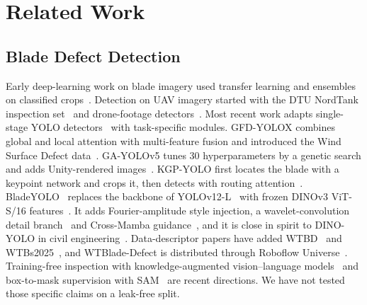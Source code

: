 \section{Related Work}
\label{sec:related}

\subsection{Blade Defect Detection}
Early deep-learning work on blade imagery used transfer learning and ensembles on classified crops~\cite{yangblade}. Detection on UAV imagery started with the DTU NordTank inspection set~\cite{shihavuddin,dtudata} and drone-footage detectors~\cite{foster}. Most recent work adapts single-stage YOLO detectors~\cite{yolo,yolov4,ultralytics,yolov12} with task-specific modules. GFD-YOLOX combines global and local attention with multi-feature fusion and introduced the Wind Surface Defect data~\cite{gfdyolox}. GA-YOLOv5 tunes 30 hyperparameters by a genetic search and adds Unity-rendered images~\cite{gayolo}. KGP-YOLO first locates the blade with a keypoint network and crops it, then detects with routing attention~\cite{kgpyolo}. BladeYOLO~\cite{bladeyolo} replaces the backbone of YOLOv12-L~\cite{yolov12} with frozen DINOv3 ViT-S/16 features~\cite{dinov3}. It adds Fourier-amplitude style injection, a wavelet-convolution detail branch~\cite{wtconv} and Cross-Mamba guidance~\cite{mamba,vmamba}, and it is close in spirit to DINO-YOLO in civil engineering~\cite{dinoyolo}. Data-descriptor papers have added WTBD~\cite{wtbd} and WTBs2025~\cite{wtbs2025}, and WTBlade-Defect is distributed through Roboflow Universe~\cite{fengche}. Training-free inspection with knowledge-augmented vision--language models~\cite{seeingunseen} and box-to-mask supervision with SAM~\cite{boxes2pixels,sam} are recent directions. We have not tested those specific claims on a leak-free split.

